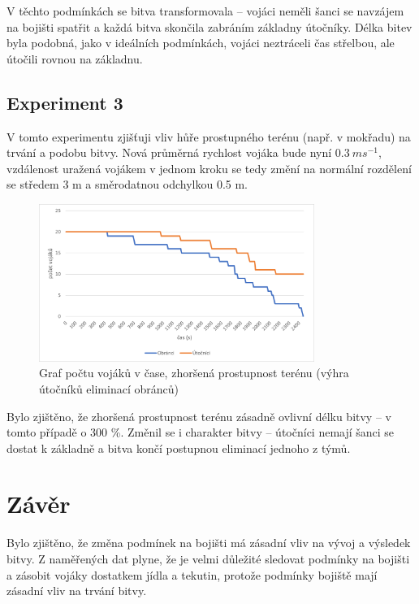 \documentclass[a4paper, 11pt]{article}
\begin{document}
    V těchto podmínkách se bitva transformovala -- vojáci neměli šanci se navzájem na bojišti spatřit a každá bitva skončila zabráním základny útočníky. Délka bitev byla podobná, jako v ideálních podmínkách, vojáci neztráceli čas střelbou, ale útočili rovnou na základnu.

    \subsection{Experiment 3}
    V tomto experimentu zjišťuji vliv hůře prostupného terénu (např. v mokřadu) na trvání a podobu bitvy. Nová průměrná rychlost vojáka bude nyní $0.3\ ms^{-1}$, vzdálenost uražená vojákem v jednom kroku se tedy změní na normální rozdělení se středem 3 m a směrodatnou odchylkou 0.5 m.
	\begin{figure}[h]
        \centering
        \includegraphics[width=0.8\textwidth]{graph4.png}
        \caption{Graf počtu vojáků v čase, zhoršená prostupnost terénu (výhra útočníků eliminací obránců)}
    \end{figure}

    Bylo zjištěno, že zhoršená prostupnost terénu zásadně ovlivní délku bitvy -- v tomto případě o 300 \%. Změnil se i charakter bitvy -- útočníci nemají šanci se dostat k základně a bitva končí postupnou eliminací jednoho z týmů.

	\section{Závěr}
    Bylo zjištěno, že změna podmínek na bojišti má zásadní vliv na vývoj a výsledek bitvy. Z naměřených dat plyne, že je velmi důležité sledovat podmínky na bojišti a zásobit vojáky dostatkem jídla a tekutin, protože podmínky bojiště mají zásadní vliv na trvání bitvy.
 
	\clearpage
	\nocite{*}
	\renewcommand{\refname}{Zdroje}
	
	
\end{document}
